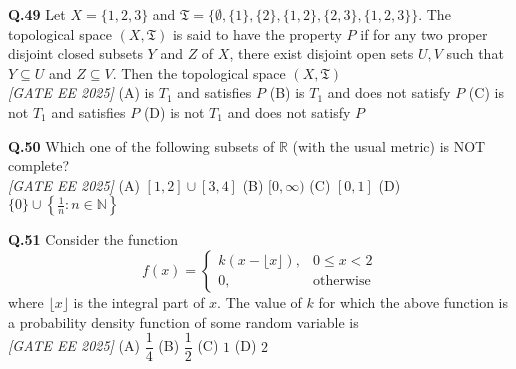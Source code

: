 \documentclass[11pt]{article}
\begin{document}
\begin{flushleft}
\textbf{Q.49} Let $X = \{1, 2, 3\}$ and $\mathfrak{T} = \{\emptyset, \{1\}, \{2\}, \{1, 2\}, \{2, 3\}, \{1, 2, 3\}\}$. The topological space $(X, \mathfrak{T})$ is said to have the property $P$ if for any two proper disjoint closed subsets $Y$ and $Z$ of $X$, there exist disjoint open sets $U, V$ such that $Y \subseteq U$ and $Z \subseteq V$. Then the topological space $(X, \mathfrak{T})$ 
\\[1ex] \textit{[GATE EE 2025]}
\newline
(A) is $T_1$ and satisfies $P$ \newline
(B) is $T_1$ and does not satisfy $P$ \newline
(C) is not $T_1$ and satisfies $P$ \newline
(D) is not $T_1$ and does not satisfy $P$ \newline
\end{flushleft}

\begin{flushleft}
\textbf{Q.50} Which one of the following subsets of $\mathbb{R}$ (with the usual metric) is NOT complete? 
\\[1ex] \textit{[GATE EE 2025]}
\newline
(A) $[1,2] \cup [3,4]$ \hspace{2em}
(B) $[0, \infty)$ \hspace{2em}
(C) $[0,1]$ \hspace{2em}
(D) $\{0\} \cup \left\{\frac{1}{n} : n \in \mathbb{N}\right\}$ \newline
\end{flushleft}

\begin{flushleft}
\textbf{Q.51} Consider the function
\[
f(x) =
\begin{cases}
k(x - \lfloor x \rfloor), & 0 \le x < 2 \\
0, & \text{otherwise}
\end{cases}
\]
where $\lfloor x \rfloor$ is the integral part of $x$. The value of $k$ for which the above function is a probability density function of some random variable is 
\\[1ex] \textit{[GATE EE 2025]}
\newline
(A) $\dfrac{1}{4}$ \hspace{2em}
(B) $\dfrac{1}{2}$ \hspace{2em}
(C) $1$ \hspace{2em}
(D) $2$ \newline
\end{flushleft}
\end{document}
